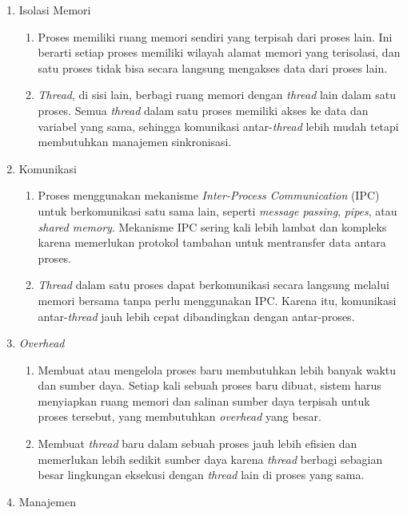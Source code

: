 \documentclass[12pt]{article}
\begin{document}
      \begin{enumerate}
	      \item Isolasi Memori
	            \begin{enumerate}
		            \item Proses memiliki ruang memori sendiri yang terpisah dari proses lain. Ini berarti setiap proses memiliki wilayah alamat memori yang terisolasi, dan satu proses tidak bisa secara langsung mengakses data dari proses lain.
		            \item \textit{Thread}, di sisi lain, berbagi ruang memori dengan \textit{thread} lain dalam satu proses. Semua \textit{thread} dalam satu proses memiliki akses ke data dan variabel yang sama, sehingga komunikasi antar-\textit{thread} lebih mudah tetapi membutuhkan manajemen sinkronisasi.
	            \end{enumerate}
	      \item Komunikasi
	            \begin{enumerate}
		            \item Proses menggunakan mekanisme \textit{Inter-Process Communication} (IPC) untuk berkomunikasi satu sama lain, seperti \textit{message passing}, \textit{pipes}, atau \textit{shared memory}. Mekanisme IPC sering kali lebih lambat dan kompleks karena memerlukan protokol tambahan untuk mentransfer data antara proses.
		            \item \textit{Thread} dalam satu proses dapat berkomunikasi secara langsung melalui memori bersama tanpa perlu menggunakan IPC. Karena itu, komunikasi antar-\textit{thread} jauh lebih cepat dibandingkan dengan antar-proses.
	            \end{enumerate}
	      \item \textit{Overhead}
	            \begin{enumerate}
		            \item Membuat atau mengelola proses baru membutuhkan lebih banyak waktu dan sumber daya. Setiap kali sebuah proses baru dibuat, sistem harus menyiapkan ruang memori dan salinan sumber daya terpisah untuk proses tersebut, yang membutuhkan \textit{overhead} yang besar.
		            \item Membuat \textit{thread} baru dalam sebuah proses jauh lebih efisien dan memerlukan lebih sedikit sumber daya karena \textit{thread} berbagi sebagian besar lingkungan eksekusi dengan \textit{thread} lain di proses yang sama.
	            \end{enumerate}
	      \item Manajemen

\end{enumerate}
\end{document}
